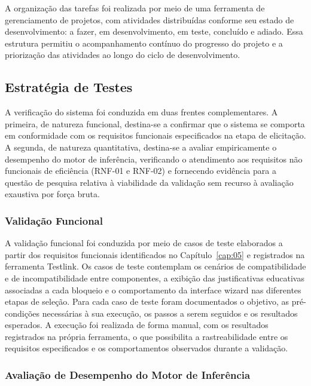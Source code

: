 A organização das tarefas foi realizada por meio de uma ferramenta de gerenciamento de projetos, com atividades distribuídas conforme seu estado
de desenvolvimento: a fazer, em desenvolvimento, em teste, concluído e adiado. Essa estrutura permitiu o acompanhamento contínuo do progresso
do projeto e a priorização das atividades ao longo do ciclo de desenvolvimento.

\subsection{Estratégia de Testes}
\label{sec:estrategia-testes}

A verificação do sistema foi conduzida em duas frentes complementares. A primeira, de
natureza funcional, destina-se a confirmar que o sistema se comporta em conformidade com
os requisitos funcionais especificados na etapa de elicitação. A segunda, de natureza
quantitativa, destina-se a avaliar empiricamente o desempenho do motor de inferência,
verificando o atendimento aos requisitos não funcionais de eficiência (RNF-01 e RNF-02)
e fornecendo evidência para a questão de pesquisa relativa à viabilidade da validação
sem recurso à avaliação exaustiva por força bruta.

\subsubsection{Validação Funcional}

A validação funcional foi conduzida por meio de casos de teste elaborados a partir dos
requisitos funcionais identificados no Capítulo~\ref{cap:05} e registrados na
ferramenta Testlink. Os casos de teste contemplam os cenários de compatibilidade e de
incompatibilidade entre componentes, a exibição das justificativas educativas associadas
a cada bloqueio e o comportamento da interface wizard nas diferentes etapas de seleção.
Para cada caso de teste foram documentados o objetivo, as pré-condições necessárias à sua
execução, os passos a serem seguidos e os resultados esperados. A execução foi realizada
de forma manual, com os resultados registrados na própria ferramenta, o que possibilita a
rastreabilidade entre os requisitos especificados e os comportamentos observados durante
a validação.

\subsubsection{Avaliação de Desempenho do Motor de Inferência}
\label{subsec:aval-desempenho}

